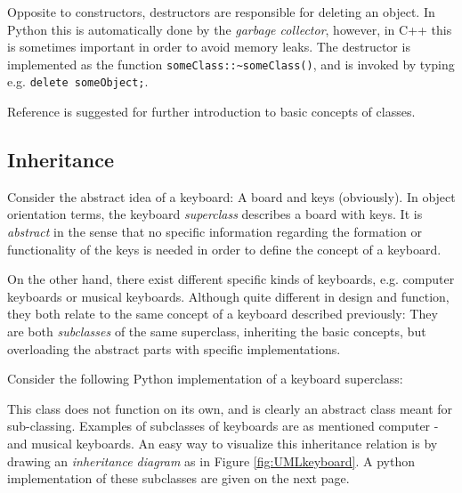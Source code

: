 Opposite to constructors, destructors are responsible for deleting an object. In Python this is automatically done by the \textit{garbage collector}, however, in C++ this is sometimes important in order to avoid memory leaks. The destructor is implemented as the function \verb+someClass::~someClass()+, and is invoked by typing e.g. \verb+delete someObject;+.

Reference \cite{inf1100} is suggested for further introduction to basic concepts of classes.  

\subsection{Inheritance}

Consider the abstract idea of a keyboard: A board and keys (obviously). In object orientation terms, the keyboard \textit{superclass} describes a board with keys. It is \textit{abstract} in the sense that no specific information regarding the formation or functionality of the keys is needed in order to define the concept of a keyboard.

On the other hand, there exist different specific kinds of keyboards, e.g. computer keyboards or musical keyboards. Although quite different in design and function, they both relate to the same concept of a keyboard described previously: They are both \textit{subclasses} of the same superclass, inheriting the basic concepts, but overloading the abstract parts with specific implementations. 

Consider the following Python implementation of a keyboard superclass:

\vspace{0.5cm}



This class does not function on its own, and is clearly an abstract class meant for sub-classing. Examples of subclasses of keyboards are as mentioned computer - and musical keyboards. An easy way to visualize this inheritance relation is by drawing an \textit{inheritance diagram} as in Figure \ref{fig:UMLkeyboard}. A python implementation of these subclasses are given on the next page. 

